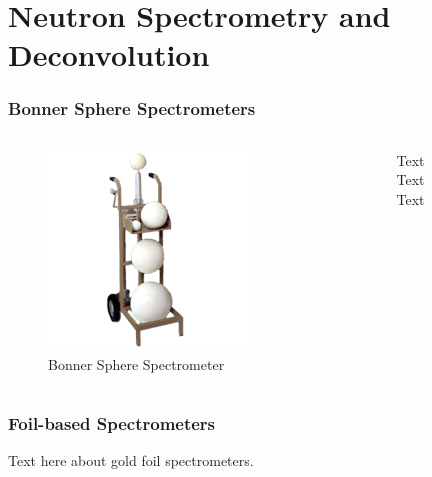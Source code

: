\documentclass[fleqn]{beamer}
\begin{document}
\section{Neutron Spectrometry and Deconvolution}
\begin{frame}
\frametitle{Bonner Sphere Spectrometers}
\begin{columns}[c]
\begin{column}{.5\textwidth}
\begin{figure}
\includegraphics[width=\textwidth]{bss}
\caption{Bonner Sphere Spectrometer}
\end{figure}
\end{column}
\begin{column}{.5\textwidth}
Text\\
Text\\
Text\\
\end{column}
\end{columns}
\end{frame}

\begin{frame}
\frametitle{Foil-based Spectrometers}

Text here about gold foil spectrometers.

\end{frame}
\end{document}
